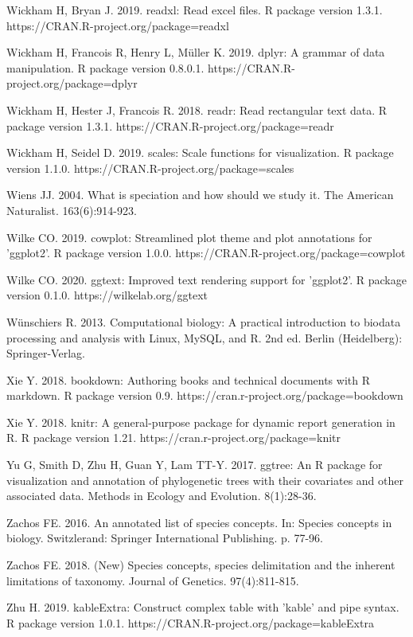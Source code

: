 Wickham H, Bryan J. 2019. readxl: Read excel files. R package version 1.3.1. https://CRAN.R-project.org/package=readxl

Wickham H, Francois R, Henry L, Müller K. 2019. dplyr: A grammar of data manipulation. R package version 0.8.0.1. https://CRAN.R-project.org/package=dplyr

Wickham H, Hester J, Francois R. 2018. readr: Read rectangular text data. R package version 1.3.1. https://CRAN.R-project.org/package=readr

Wickham H, Seidel D. 2019. scales: Scale functions for visualization. R package version 1.1.0. https://CRAN.R-project.org/package=scales


Wiens JJ. 2004. What is speciation and how should we study it. The American Naturalist. 163(6):914-923.

Wilke CO. 2019. cowplot: Streamlined plot theme and plot annotations for 'ggplot2'. R package version 1.0.0. https://CRAN.R-project.org/package=cowplot

Wilke CO. 2020. ggtext: Improved text rendering support for 'ggplot2'. R package version 0.1.0. https://wilkelab.org/ggtext

Wünschiers R. 2013. Computational biology: A practical introduction to biodata processing and analysis with Linux, MySQL, and R. 2nd ed. Berlin (Heidelberg): Springer-Verlag.

Xie Y. 2018. bookdown: Authoring books and technical documents with R markdown. R package version 0.9. https://cran.r-project.org/package=bookdown

Xie Y. 2018. knitr: A general-purpose package for dynamic report generation in R. R package version 1.21. https://cran.r-project.org/package=knitr

Yu G, Smith D, Zhu H, Guan Y, Lam TT-Y. 2017. ggtree: An R package for visualization and annotation of phylogenetic trees with their covariates and other associated data. Methods in Ecology and Evolution. 8(1):28-36.

Zachos FE. 2016. An annotated list of species concepts. In: Species concepts in biology. Switzlerand: Springer International Publishing. p. 77-96.

Zachos FE. 2018. (New) Species concepts, species delimitation and the inherent limitations of taxonomy. Journal of Genetics. 97(4):811-815.

Zhu H. 2019. kableExtra: Construct complex table with 'kable' and pipe syntax. R package version 1.0.1. https://CRAN.R-project.org/package=kableExtra

\setlength{\parindent}{0em}
\setlength{\leftskip}{0em}
\setlength{\parskip}{6pt}
\doublespacing
